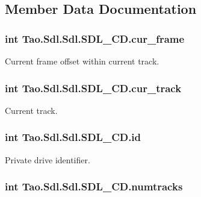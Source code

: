\subsection{Member Data Documentation}
\hypertarget{class_tao_1_1_sdl_1_1_sdl_1_1_s_d_l___c_d_a316ed7c6cd0e34e361ee549b70f08b69}{
\subsubsection[{cur\_\-frame}]{\setlength{\rightskip}{0pt plus 5cm}int {\bf Tao.Sdl.Sdl.SDL\_\-CD.cur\_\-frame}}}
\label{class_tao_1_1_sdl_1_1_sdl_1_1_s_d_l___c_d_a316ed7c6cd0e34e361ee549b70f08b69}


Current frame offset within current track. 

\hypertarget{class_tao_1_1_sdl_1_1_sdl_1_1_s_d_l___c_d_a21e657e809122dcd17a4c3d1104c5cef}{
\subsubsection[{cur\_\-track}]{\setlength{\rightskip}{0pt plus 5cm}int {\bf Tao.Sdl.Sdl.SDL\_\-CD.cur\_\-track}}}
\label{class_tao_1_1_sdl_1_1_sdl_1_1_s_d_l___c_d_a21e657e809122dcd17a4c3d1104c5cef}


Current track. 

\hypertarget{class_tao_1_1_sdl_1_1_sdl_1_1_s_d_l___c_d_aa67216f022e18c25481dadfa918c3b0d}{
\subsubsection[{id}]{\setlength{\rightskip}{0pt plus 5cm}int {\bf Tao.Sdl.Sdl.SDL\_\-CD.id}}}
\label{class_tao_1_1_sdl_1_1_sdl_1_1_s_d_l___c_d_aa67216f022e18c25481dadfa918c3b0d}


Private drive identifier. 

\hypertarget{class_tao_1_1_sdl_1_1_sdl_1_1_s_d_l___c_d_ae41951995f9e509c8a85316aec65696b}{
\subsubsection[{numtracks}]{\setlength{\rightskip}{0pt plus 5cm}int {\bf Tao.Sdl.Sdl.SDL\_\-CD.numtracks}}}
\label{class_tao_1_1_sdl_1_1_sdl_1_1_s_d_l___c_d_ae41951995f9e509c8a85316aec65696b}



